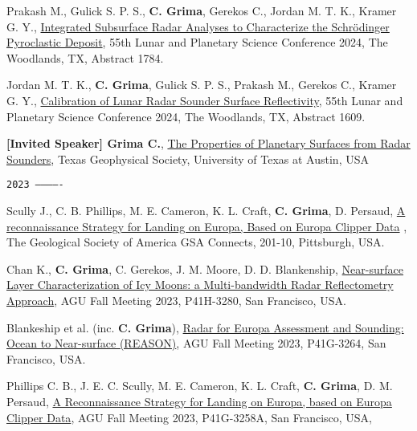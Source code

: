 \begin{etaremune}
\item
     Prakash M., Gulick S. P. S., \textbf{C. Grima}, Gerekos C., Jordan M. T. K., Kramer G. Y., \href{https://www.hou.usra.edu/meetings/lpsc2024/pdf/1784.pdf}{Integrated Subsurface Radar Analyses to Characterize the Schrödinger Pyroclastic Deposit}, 55th Lunar and Planetary Science Conference 2024, The Woodlands, TX, Abstract 1784.

\item
     Jordan M. T. K., \textbf{C. Grima}, Gulick S. P. S., Prakash M., Gerekos C., Kramer G. Y., \href{https://www.hou.usra.edu/meetings/lpsc2024/pdf/1609.pdf}{Calibration of Lunar Radar Sounder Surface Reflectivity}, 55th Lunar and Planetary Science Conference 2024, The Woodlands, TX, Abstract 1609.

\item
    \textbf{[Invited Speaker] Grima C.}, \href{}{The Properties of Planetary Surfaces from Radar Sounders}, Texas Geophysical Society, University of Texas at Austin, USA

\hspace{-2em}\texttt{2023 -------------}

\item
    Scully J., C. B. Phillips, M. E. Cameron, K. L. Craft, \textbf{C. Grima}, D. Persaud, \href{https://gsa.confex.com/gsa/2023AM/meetingapp.cgi/Paper/393517}{A reconnaissance Strategy for Landing on Europa, Based on Europa Clipper Data} , The Geological Society of America GSA Connects, 201-10, Pittsburgh, USA.

\item
   Chan K., \textbf{C. Grima}, C. Gerekos, J. M. Moore, D. D. Blankenship,  \href{https://agu.confex.com/agu/fm23/meetingapp.cgi/Paper/1404410}{Near-surface Layer Characterization of Icy Moons: a Multi-bandwidth Radar Reflectometry Approach}, AGU Fall Meeting 2023, P41H-3280, San Francisco, USA.

\item
   Blankeship et al. (inc. \textbf{C. Grima}), \href{https://agu.confex.com/agu/fm23/meetingapp.cgi/Paper/1434939}{Radar for Europa Assessment and Sounding: Ocean to Near-surface (REASON)}, AGU Fall Meeting 2023, P41G-3264, San Francisco, USA.

\item
    Phillips C. B., J. E. C. Scully, M. E. Cameron, K. L. Craft, \textbf{C. Grima}, D. M. Persaud, \href{https://agu.confex.com/agu/fm23/meetingapp.cgi/Paper/1400206}{A Reconnaissance Strategy for Landing on Europa, based on Europa Clipper Data}, AGU Fall Meeting 2023, P41G-3258A, San Francisco, USA,


\end{etaremune}
